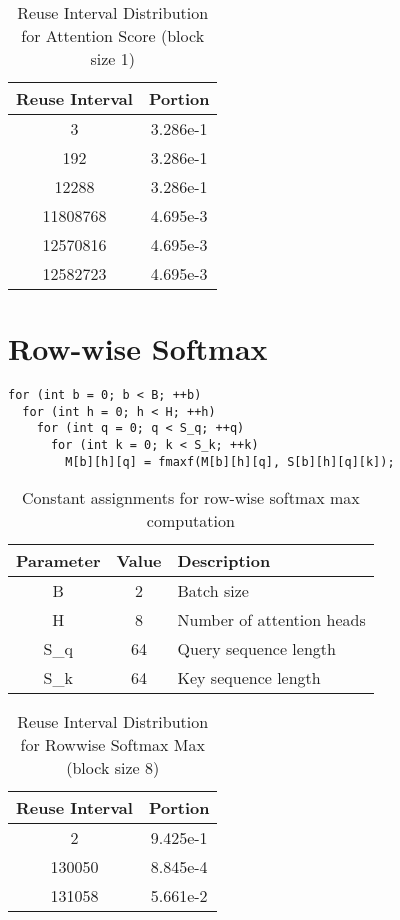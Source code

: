 \documentclass[conference]{article}
\begin{document}
\begin{table}[H]
\centering
\begin{tabular}{|c|c|}
    \hline
    Reuse Interval & Portion \\ 
    \hline
    3 & 3.286e-1 \\ 
    192 & 3.286e-1 \\ 
    12288 & 3.286e-1 \\ 
    11808768 & 4.695e-3 \\ 
    12570816 & 4.695e-3 \\ 
    12582723 & 4.695e-3 \\ 
    \hline
\end{tabular}
\caption{Reuse Interval Distribution for Attention Score (block size 1)}
\end{table}

\section{Row-wise Softmax}
\begin{verbatim}
for (int b = 0; b < B; ++b)
  for (int h = 0; h < H; ++h)
    for (int q = 0; q < S_q; ++q)
      for (int k = 0; k < S_k; ++k)
        M[b][h][q] = fmaxf(M[b][h][q], S[b][h][q][k]);
\end{verbatim}
\begin{table}[H]
\centering
\begin{tabular}{|c|c|l|}
\hline
Parameter & Value & Description \\
\hline
B & 2 & Batch size \\
H & 8 & Number of attention heads \\
S\_q & 64 & Query sequence length \\
S\_k & 64 & Key sequence length \\
\hline
\end{tabular}
\caption{Constant assignments for row-wise softmax max computation}
\end{table}

\begin{table}[H]
\centering
\begin{tabular}{|c|c|}
    \hline
    Reuse Interval & Portion \\ 
    \hline
    2 & 9.425e-1 \\ 
    130050 & 8.845e-4 \\ 
    131058 & 5.661e-2 \\ 
    \hline
\end{tabular}
\caption{Reuse Interval Distribution for Rowwise Softmax Max (block size 8)}
\end{table}
\end{document}
